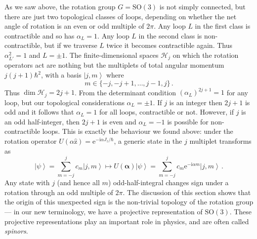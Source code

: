 \documentclass{article}
\theoremstyle{plain}\theoremheaderfont{\normalfont\itshape}\theorembodyfont{\rmfamily}\theoremseparator{.}\newtheorem*{rem}{Remark}\newtheorem*{ex}{Example}\newtheorem*{proof}{Proof}\newtheorem*{altp}{Alternative proof}
\theoremstyle{plain}\theoremheaderfont{\normalfont\bfseries}\theorembodyfont{\rmfamily}\theoremseparator{.}\newtheorem{thm}{Theorem}[section]\newtheorem{lem}[thm]{Lemma}\newtheorem{prop}[thm]{Proposition}\newtheorem*{cor}{Corollary}\newtheorem{defn}[thm]{Definition}\newtheorem{clm}[thm]{Claim}\newtheorem{clminproof}{Claim}
\theoremstyle{break}\theoremheaderfont{\normalfont\itshape}\theorembodyfont{\rmfamily}\theoremseparator{.\medskip}\newtheorem*{proofskip}{Proof}\newtheorem*{exs}{Examples}\newtheorem*{rems}{Remarks}
\theoremstyle{break}\theoremheaderfont{\normalfont\bfseries}\theorembodyfont{\rmfamily}\theoremseparator{.\medskip}\newtheorem{lemskip}[thm]{Lemma}\newtheorem{defnskip}[thm]{Definition}\newtheorem{propskip}[thm]{Proposition}\newtheorem{thmskip}[thm]{Theorem}
\numberwithin{equation}{section}
\newcommand{\ii}{\mathrm{i}}
\newcommand{\ee}{\mathrm{e}}
\newcommand{\ket}[1]{\left| #1 \right\rangle}
\newcommand{\vb}[1]{\bm{\mathrm{#1}}}
\newcommand{\hb}{\mathcal{H}}
\newcommand{\SO}{\mathrm{SO}}
\begin{document}
    As we saw above, the rotation group \(G=\SO(3)\) is not simply connected, but there are just two topological classes of loops, depending on whether the net angle of rotation is an even or odd multiple of \(2\pi\). Any loop \(L\) in the first class is contractible and so has \(\alpha_L=1\). Any loop \(L\) in the second class is non-contractible, but if we traverse \(L\) twice it becomes contractible again. Thus \(\alpha_{L'}^2=1\) and \(L=\pm 1\). The finite-dimensional spaces \(\hb_j\) on which the rotation operators act are nothing but the multiplets of total angular momentum \(j(j+1)\hbar^2\), with a basis \(\ket{j,m}\) where
    \begin{equation}
        m\in\{-j,-j+1,\dots,j-1,j\}\,.
    \end{equation}
    Thus \(\dim\hb_j=2j+1\). From the determinant condition \((\alpha_L)^{2j+1}=1\) for any loop, but our topological considerations \(\alpha_L=\pm 1\). If \(j\) is an integer then \(2j+1\) is odd and it follows that \(\alpha_L=1\) for all loops, contractible or not. However, if \(j\) is an odd half-integer, then \(2j+1\) is even and \(\alpha_L=-1\) is possible for non-contractible loops. This is exactly the behaviour we found above: under the rotation operator \(U(\alpha\hat{\vb{z}})=\ee^{-\ii \alpha J_z/\hbar}\), a generic state in the \(j\) multiplet transforms as
    \begin{equation}
        \ket{\psi}=\sum_{m=-j}^{j}c_m\ket{j,m}\longmapsto U(\bm{\alpha})\ket{\psi}=\sum_{m=-j}^{j}c_m \ee^{-\ii \alpha m}\ket{j,m}\,.
    \end{equation}
    Any state with \(j\) (and hence all \(m\)) odd-half-integral changes sign under a rotation through an odd multiple of \(2\pi\). The discussion of this section shows that the origin of this unexpected sign is the non-trivial topology of the rotation group --- in our new terminology, we have a projective representation of \(\SO(3)\). These projective representations play an important role in physics, and are often called \textit{spinors}.
\end{document}
